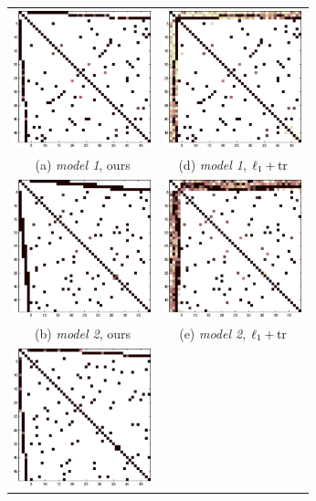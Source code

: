 \begin{figure}
\label{fig:synth}
\center
\begin{tabular}{cc}
    \includegraphics[width=4cm]{fig/disjoint_om} 
  & \includegraphics[width=4cm]{fig/disjoint_tr} 
   \\    (a) \textit{model 1}, ours & (d)  \textit{model 1}, $\ell_1+{\rm tr}$ \\[6pt]
      \includegraphics[width=4cm]{fig/overlap_om}
  &   \includegraphics[width=4cm]{fig/overlap_tr}
   \\    (b)  \textit{model 2}, ours   & (e)  \textit{model 2}, $\ell_1+{\rm tr}$    \\[6pt]
      \includegraphics[width=4cm]{fig/diff_om}

\end{tabular}
\end{figure}
